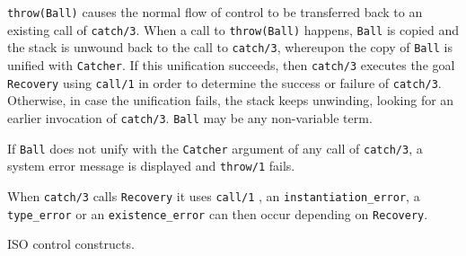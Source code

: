 \texttt{throw(Ball)} causes the normal flow of control to be transferred
back to an existing call of \texttt{catch/3}. When a call to
\texttt{throw(Ball)} happens, \texttt{Ball} is copied and the stack is
unwound back to the call to \texttt{catch/3}, whereupon the copy of
\texttt{Ball} is unified with \texttt{Catcher}. If this unification
succeeds, then \texttt{catch/3} executes the goal \texttt{Recovery} using
\texttt{call/1}  in order to determine the success or
failure of \texttt{catch/3}. Otherwise, in case the unification fails,
the stack keeps unwinding, looking for an earlier invocation of
\texttt{catch/3}. \texttt{Ball} may be any non-variable term.

\begin{PlErrors}





\end{PlErrors}

If \texttt{Ball} does not unify with the \texttt{Catcher} argument of
any call of \texttt{catch/3}, a system error message is displayed and
\texttt{throw/1} fails.

When \texttt{catch/3} calls \texttt{Recovery} it uses \texttt{call/1}
, an \texttt{instantiation\_error}, a \texttt{type\_error}
or an \texttt{existence\_error} can then occur depending on
\texttt{Recovery}. 

\Portability

ISO control constructs.


